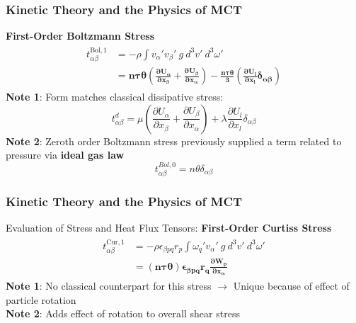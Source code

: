 \documentclass{beamer}
\begin{document}
\begin{frame}
\frametitle{Kinetic Theory and the Physics of MCT}
\textbf{First-Order Boltzmann Stress}
\begin{align*}
\begin{split}
 \label{surfaceBoltzmann}
 t^{\text{Bol},1}_{\alpha \beta} &= -\rho\int 
v_\alpha'v_\beta' \ g \ d^3v' \ d^3 \omega'   \\
&= \bm{ n\tau\theta(\frac{\partial U_\alpha}{\partial x_\beta} 
+ \frac{\partial U_\beta}{\partial x_\alpha}) - 
\frac{n\tau\theta}{3}(\frac{\partial U_l}{\partial x_l} \delta_{\alpha \beta}) }
\end{split}
\end{align*}
\normalsize
\pause
\textbf{Note 1}: Form matches classical dissipative stress:
\begin{equation*}
 t^{d}_{\alpha \beta} = \mu (\frac{\partial U_{\alpha}}{\partial 
x_{\beta}} + \frac{\partial U_{\beta}}{\partial x_{\alpha}}) + \lambda 
\frac{\partial U_{l}}{\partial x_{l}}\delta_{\alpha \beta}
\end{equation*}
\pause
\textbf{Note 2}: Zeroth order Boltzmann stress previously supplied a term 
related to pressure via \textbf{ideal gas law}
\begin{equation*}
 t^{Bol, 0}_{\alpha \beta} = n\theta \delta_{\alpha \beta}
\end{equation*}

\end{frame}

\begin{frame}
\frametitle{Kinetic Theory and the Physics of MCT}
Evaluation of Stress and Heat Flux Tensors: \textbf{First-Order Curtiss Stress}
\begin{align*}
\begin{split}
 \label{surfaceCurtiss}
 t^{\text{Cur},1}_{\alpha \beta} &= -\rho\epsilon_{\beta 
pq}r_{p}\int \omega_q'v_{\alpha}' \
g \ d^3v' \ d^3 \omega' \\
 &= \bm{(n\tau\theta) \epsilon_{\beta pq}r_q \frac{\partial W_p}{\partial 
x_\alpha}} 
\end{split}
\end{align*}
\pause
\textbf{Note 1}: No classical counterpart for this stress $\rightarrow$ Unique 
because of effect of particle rotation \\
\vspace{5mm}
\pause
\textbf{Note 2}: Adds effect of rotation to overall shear stress
\end{frame}
\end{document}
